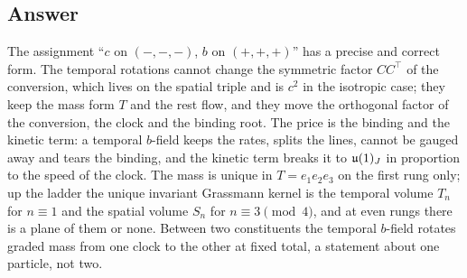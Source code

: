 \subsection{Answer}
\label{e6:sec:answer}

The assignment ``$c$ on $(-,-,-)$, $b$ on $(+,+,+)$'' has a precise and correct form. The temporal rotations cannot change the symmetric factor
$CC^{\!\top}$ of the conversion, which lives on the spatial triple and is $c^2$ in the isotropic case; they keep the mass form $T$ and the rest
flow, and they move the orthogonal factor of the conversion, the clock and the binding root. The price is the binding and the kinetic term: a
temporal $b$-field keeps the rates, splits the lines, cannot be gauged away and tears the binding, and the kinetic term breaks it to $\mathfrak{u}(1)_J$ in
proportion to the speed of the clock. The mass is unique in $T=e_1e_2e_3$ on the first rung only; up the ladder the unique invariant Grassmann kernel is the temporal volume
$T_n$ for $n\equiv1$ and the spatial volume $S_n$ for $n\equiv3\pmod4$, and at even rungs there is a plane of them or none. Between two constituents the temporal $b$-field rotates
graded mass from one clock to the other at fixed total, a statement about one particle, not two.

